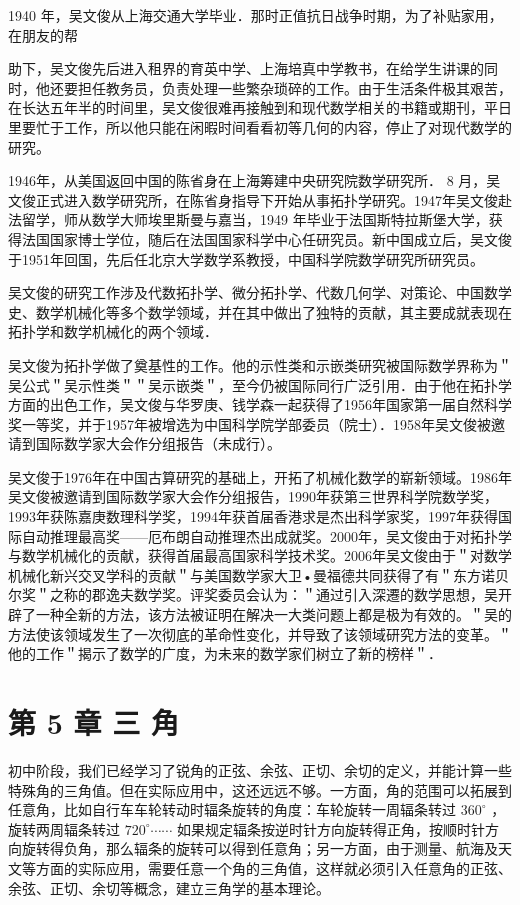 \documentclass[10pt]{article}
\begin{document}
1940 年，吴文俊从上海交通大学毕业．那时正值抗日战争时期，为了补贴家用，在朋友的帮

助下，吴文俊先后进入租界的育英中学、上海培真中学教书，在给学生讲课的同时，他还要担任教务员，负责处理一些繁杂琐碎的工作。由于生活条件极其艰苦，在长达五年半的时间里，吴文俊很难再接触到和现代数学相关的书籍或期刊，平日里要忙于工作，所以他只能在闲暇时间看看初等几何的内容，停止了对现代数学的研究。

1946年，从美国返回中国的陈省身在上海筹建中央研究院数学研究所． 8 月，吴文俊正式进入数学研究所，在陈省身指导下开始从事拓扑学研究。1947年吴文俊赴法留学，师从数学大师埃里斯曼与嘉当，1949 年毕业于法国斯特拉斯堡大学，获得法国国家博士学位，随后在法国国家科学中心任研究员。新中国成立后，吴文俊于1951年回国，先后任北京大学数学系教授，中国科学院数学研究所研究员。

吴文俊的研究工作涉及代数拓扑学、微分拓扑学、代数几何学、对策论、中国数学史、数学机械化等多个数学领域，并在其中做出了独特的贡献，其主要成就表现在拓扑学和数学机械化的两个领域．

吴文俊为拓扑学做了奠基性的工作。他的示性类和示嵌类研究被国际数学界称为＂吴公式＂吴示性类＂＂吴示嵌类＂，至今仍被国际同行广泛引用．由于他在拓扑学方面的出色工作，吴文俊与华罗庚、钱学森一起获得了1956年国家第一届自然科学奖一等奖，并于1957年被增选为中国科学院学部委员（院士）．1958年吴文俊被邀请到国际数学家大会作分组报告（未成行）。

吴文俊于1976年在中国古算研究的基础上，开拓了机械化数学的崭新领域。1986年吴文俊被邀请到国际数学家大会作分组报告，1990年获第三世界科学院数学奖，1993年获陈嘉庚数理科学奖，1994年获首届香港求是杰出科学家奖，1997年获得国际自动推理最高奖——厄布朗自动推理杰出成就奖。2000年，吴文俊由于对拓扑学与数学机械化的贡献，获得首届最高国家科学技术奖。2006年吴文俊由于＂对数学机械化新兴交叉学科的贡献＂与美国数学家大卫•曼福德共同获得了有＂东方诺贝尔奖＂之称的郡逸夫数学奖。评奖委员会认为：＂通过引入深遷的数学思想，吴开辟了一种全新的方法，该方法被证明在解决一大类问题上都是极为有效的。＂吴的方法使该领域发生了一次彻底的革命性变化，并导致了该领域研究方法的变革。＂他的工作＂揭示了数学的广度，为未来的数学家们树立了新的榜样＂．

\section*{第 5 章 三 角}
初中阶段，我们已经学习了锐角的正弦、余弦、正切、余切的定义，并能计算一些特殊角的三角值。但在实际应用中，这还远远不够。一方面，角的范围可以拓展到任意角，比如自行车车轮转动时辐条旋转的角度：车轮旋转一周辐条转过 \(360^{\circ}\) ，旋转两周辐条转过 \(720^{\circ} \cdots \cdots\) 如果规定辐条按逆时针方向旋转得正角，按顺时针方向旋转得负角，那么辐条的旋转可以得到任意角；另一方面，由于测量、航海及天文等方面的实际应用，需要任意一个角的三角值，这样就必须引入任意角的正弦、余弦、正切、余切等概念，建立三角学的基本理论。
\end{document}
